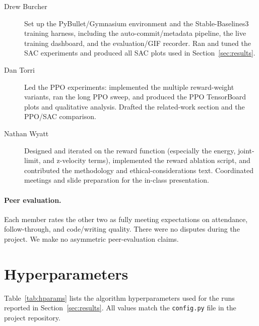 \documentclass[sigconf,nonacm]{acmart}
\begin{document}
\begin{description}
\item[Drew Burcher] Set up the PyBullet/Gymnasium environment and the
  Stable-Baselines3 training harness, including the auto-commit/metadata
  pipeline, the live training dashboard, and the evaluation/GIF recorder.
  Ran and tuned the SAC experiments and produced all SAC plots used in
  Section~\ref{sec:results}.
\item[Dan Torri] Led the PPO experiments: implemented the multiple
  reward-weight variants, ran the long PPO sweep, and produced the PPO
  TensorBoard plots and qualitative analysis. Drafted the related-work
  section and the PPO/SAC comparison.
\item[Nathan Wyatt] Designed and iterated on the reward function (especially
  the energy, joint-limit, and z-velocity terms), implemented the reward
  ablation script, and contributed the methodology and ethical-considerations
  text. Coordinated meetings and slide preparation for the in-class
  presentation.
\end{description}

\paragraph{Peer evaluation.}
Each member rates the other two as fully meeting expectations on attendance,
follow-through, and code/writing quality. There were no disputes during the
project. We make no asymmetric peer-evaluation claims.




\appendix

\section{Hyperparameters}
Table~\ref{tab:hparams} lists the algorithm hyperparameters used for the runs
reported in Section~\ref{sec:results}. All values match the
\texttt{config.py} file in the project repository.
\end{document}
